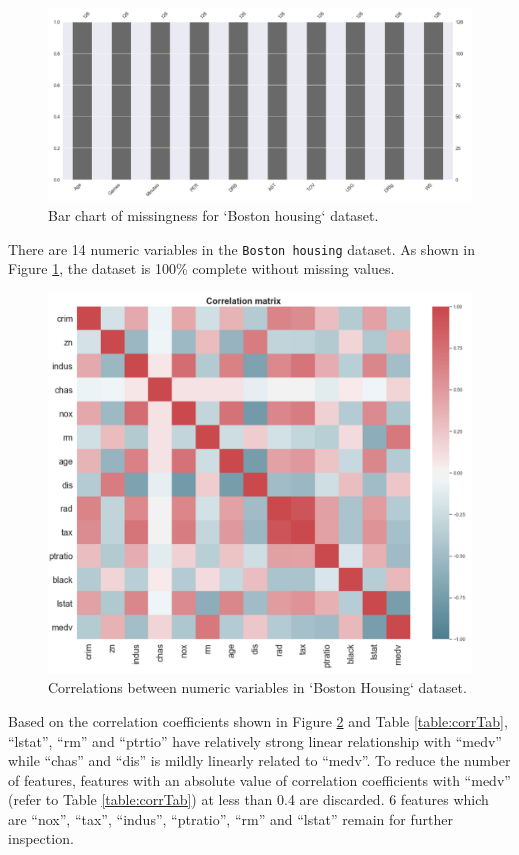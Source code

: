 \documentclass[letterpaper,12pt,twoside,]{pinp}
\begin{document}
\begin{figure}
\includegraphics[width=1\linewidth]{miss_house.png}
\centering
\caption{Bar chart of missingness for `Boston housing` dataset.}
\label{fig:missHouse}
\end{figure}

There are 14 numeric variables in the \texttt{Boston\ housing} dataset.
As shown in Figure \ref{fig:missHouse}, the dataset is 100\% complete
without missing values.

\begin{figure}
\includegraphics[width=1\linewidth]{house_corr.png}
\centering
\caption{Correlations between numeric variables in `Boston Housing` dataset.}
\label{fig:corrHouse}
\end{figure}

Based on the correlation coefficients shown in Figure
\ref{fig:corrHouse} and Table \ref{table:corrTab}, ``lstat'', ``rm'' and
``ptrtio'' have relatively strong linear relationship with ``medv''
while ``chas'' and ``dis'' is mildly linearly related to ``medv''. To
reduce the number of features, features with an absolute value of
correlation coefficients with ``medv'' (refer to Table
\ref{table:corrTab}) at less than 0.4 are discarded. 6 features which
are ``nox'', ``tax'', ``indus'', ``ptratio'', ``rm'' and ``lstat''
remain for further inspection.
\end{document}
